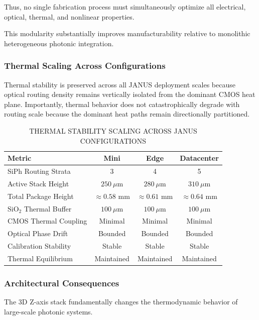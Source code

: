 \documentclass[journal]{IEEEtran}
\begin{document}
Thus, no single fabrication process must simultaneously optimize all electrical, optical, thermal, and nonlinear properties.

This modularity substantially improves manufacturability relative to monolithic heterogeneous photonic integration.

\subsubsection{\textbf{Thermal Scaling Across Configurations}}

Thermal stability is preserved across all JANUS deployment scales because optical routing density remains vertically isolated from the
dominant CMOS heat plane. Importantly, thermal behavior does not catastrophically degrade with routing scale because the dominant heat paths remain directionally partitioned.

\begin{table}[htbp]
\centering
\small
\setlength{\tabcolsep}{3pt}
\caption{THERMAL STABILITY SCALING ACROSS JANUS CONFIGURATIONS}
\label{tab:table12}
\begin{tabular}{lccc}
\toprule
Metric & Mini & Edge & Datacenter \\
\midrule
SiPh Routing Strata & 3 & 4 & 5 \\
Active Stack Height & $250\ \mu\text{m}$ & $280\ \mu\text{m}$ & $310\ \mu\text{m}$ \\
Total Package Height & $\approx 0.58\text{ mm}$ & $\approx 0.61\text{ mm}$ & $\approx 0.64\text{ mm}$ \\
$\text{SiO}_2$ Thermal Buffer & $100\ \mu\text{m}$ & $100\ \mu\text{m}$ & $100\ \mu\text{m}$ \\
CMOS Thermal Coupling & Minimal & Minimal & Minimal \\
Optical Phase Drift & Bounded & Bounded & Bounded \\
Calibration Stability & Stable & Stable & Stable \\
Thermal Equilibrium & Maintained & Maintained & Maintained \\
\bottomrule
\end{tabular}
\end{table}

\subsubsection{\textbf{Architectural Consequences}}

The 3D Z-axis stack fundamentally changes the thermodynamic behavior of large-scale photonic systems.
\end{document}
